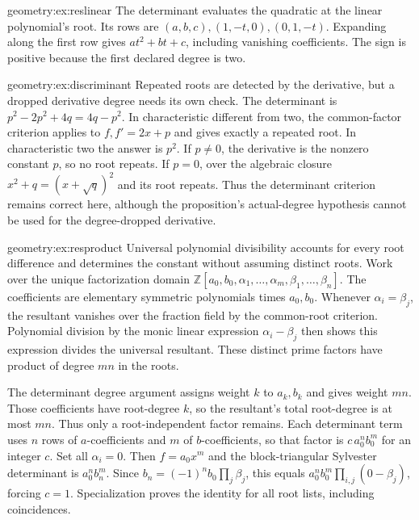 \begin{solution}{geometry:ex:reslinear}
\idea The determinant evaluates the quadratic at the linear polynomial's root.
\writeup Its rows are $(a,b,c),(1,-t,0),(0,1,-t)$. Expanding along the first row gives $at^2+bt+c$, including vanishing coefficients. The sign is positive because the first declared degree is two.
\end{solution}
\begin{solution}{geometry:ex:discriminant}
\idea Repeated roots are detected by the derivative, but a dropped derivative degree needs its own check.
\writeup The determinant is $p^2-2p^2+4q=4q-p^2$. In characteristic different from two, the common-factor criterion applies to $f,f'=2x+p$ and gives exactly a repeated root. In characteristic two the answer is $p^2$. If $p\ne0$, the derivative is the nonzero constant $p$, so no root repeats. If $p=0$, over the algebraic closure $x^2+q=(x+\sqrt q)^2$ and its root repeats. Thus the determinant criterion remains correct here, although the proposition's actual-degree hypothesis cannot be used for the degree-dropped derivative.
\end{solution}
\begin{solution}{geometry:ex:resproduct}
\idea Universal polynomial divisibility accounts for every root difference and determines the constant without assuming distinct roots.
\writeup Work over the unique factorization domain $\mathbb Z[a_0,b_0,\alpha_1,\ldots,\alpha_m,\beta_1,\ldots,\beta_n]$. The coefficients are elementary symmetric polynomials times $a_0,b_0$. Whenever $\alpha_i=\beta_j$, the resultant vanishes over the fraction field by the common-root criterion. Polynomial division by the monic linear expression $\alpha_i-\beta_j$ then shows this expression divides the universal resultant. These distinct prime factors have product of degree $mn$ in the roots.

The determinant degree argument assigns weight $k$ to $a_k,b_k$ and gives weight $mn$. Those coefficients have root-degree $k$, so the resultant's total root-degree is at most $mn$. Thus only a root-independent factor remains. Each determinant term uses $n$ rows of $a$-coefficients and $m$ of $b$-coefficients, so that factor is $c\,a_0^nb_0^m$ for an integer $c$. Set all $\alpha_i=0$. Then $f=a_0x^m$ and the block-triangular Sylvester determinant is $a_0^nb_n^m$. Since $b_n=(-1)^nb_0\prod_j\beta_j$, this equals $a_0^nb_0^m\prod_{i,j}(0-\beta_j)$, forcing $c=1$. Specialization proves the identity for all root lists, including coincidences.
\end{solution}
